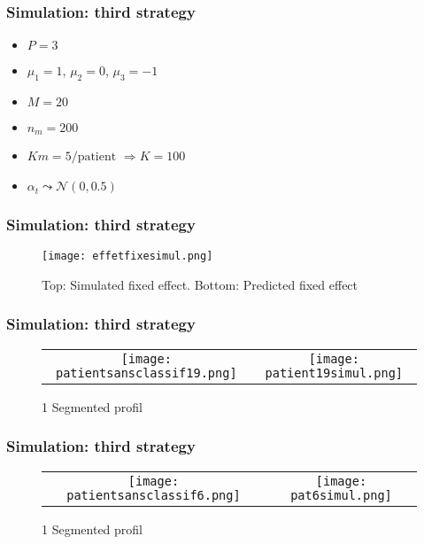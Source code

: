 \documentclass[compress]{beamer}
\begin{document}
\begin{frame}
\frametitle{Simulation: third strategy}
\begin{itemize}
\item $P=3$
\item $\mu_1=1$, $\mu_2=0$, $\mu_3=-1$
\item $M=20$
\item $n_m=200$
\item $Km=5/\mbox{patient}$ $\Rightarrow K=100$
\item $\alpha_t\leadsto\mathcal{N}(0,0.5)$
\end{itemize}

\end{frame}
\begin{frame}
\frametitle{Simulation: third strategy}

\begin{figure}
\caption{Top: Simulated fixed effect. Bottom: Predicted fixed effect}
\begin{center}
\texttt{[image: effetfixesimul.png]}
\end{center}
\end{figure}
\end{frame}

\begin{frame}
\frametitle{Simulation: third strategy}
\begin{figure}
\caption{1 Segmented profil}
\begin{tabular}{cc}
\texttt{[image: patientsansclassif19.png]}&
\texttt{[image: patient19simul.png]}
\end{tabular}
\end{figure}
\end{frame}

\begin{frame}
\frametitle{Simulation: third strategy}
\begin{figure}
\caption{1 Segmented profil}
\begin{tabular}{cc}
\texttt{[image: patientsansclassif6.png]}&
\texttt{[image: pat6simul.png]}
\end{tabular}
\end{figure}

\end{frame}
\end{document}
